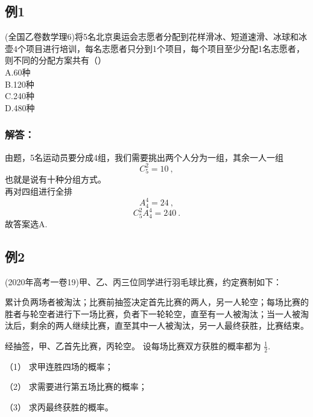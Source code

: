 
\begin{issues}
\issueDraft
\end{issues}
\subsection{例1}
(全国乙卷数学理6)将5名北京奥运会志愿者分配到花样滑冰、短道速滑、冰球和冰壶4个项目进行培训，每名志愿者只分到1个项目，每个项目至少分配1名志愿者，则不同的分配方案共有（）\\
A.60种\\
B.120种\\
C.240种\\
D.480种

\subsubsection{解答：}
由题，5名运动员要分成4组，我们需要挑出两个人分为一组，其余一人一组
\begin{equation}
C_5^2 = 10 ~,
\end{equation}
也就是说有十种分组方式。\\
再对四组进行全排
\begin{equation}
A_4^4 = 24~,
\end{equation}
\begin{equation}
C_5^2A_4^4 =240 ~.
\end{equation}
故答案选A.

\subsection{例2}
(2020年高考一卷19)甲、乙、丙三位同学进行羽毛球比赛，约定赛制如下：

累计负两场者被淘汰；比赛前抽签决定首先比赛的两人，另一人轮空；每场比赛的胜者与轮空者进行下一场比赛，负者下一轮轮空，直至有一人被淘汰；当一人被淘汰后，剩余的两人继续比赛，直至其中一人被淘汰，另一人最终获胜，比赛结束。

经抽签，甲、乙首先比赛，丙轮空。 设每场比赛双方获胜的概率都为 $\frac{1}{2}$.

（1）  求甲连胜四场的概率；

（2）  求需要进行第五场比赛的概率；

（3）  求丙最终获胜的概率。
